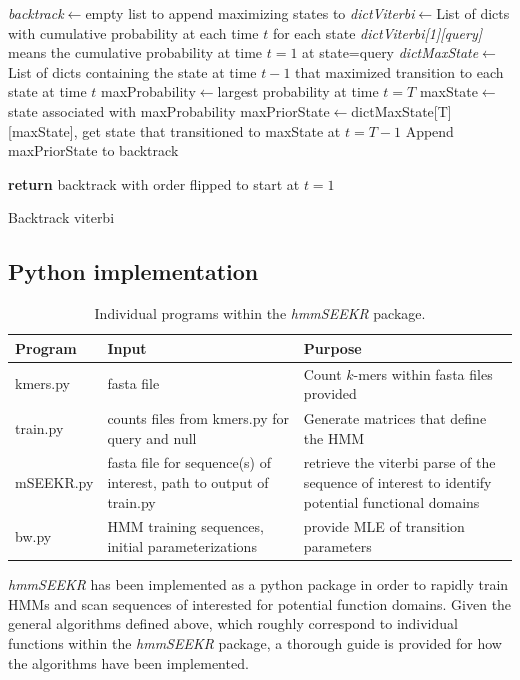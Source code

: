 \begin{algorithm}[h]
\DontPrintSemicolon
{}
\SetAlgoLined

\emph{backtrack}$\leftarrow$empty list to append maximizing states to\;
\emph{dictViterbi}$\leftarrow$List of dicts with cumulative probability at each time $t$ for each state\;
\;
\emph{dictViterbi[1][query]} means the cumulative probability at time $t=1$ at state=query\;\;
\emph{dictMaxState}$\leftarrow$List of dicts containing the state at time $t-1$ that maximized transition to each state at time $t$\;
\;
\;
maxProbability$\leftarrow$largest probability at time $t=T$\;
maxState$\leftarrow$state associated with maxProbability\;
maxPriorState$\leftarrow$dictMaxState[T][maxState], get state that transitioned to maxState at $t=T-1$\;
\;
Append maxPriorState to backtrack\;


\textbf{return} backtrack with order flipped to start at $t=1$

 \caption{Backtrack viterbi}
 \label{alg:backtrack}
\end{algorithm}

\clearpage

\subsection{Python implementation}
\begin{table}[t!]
\centering
 \begin{tabular}{|p{3cm}|p{5cm}|p{5cm}|}
 \hline
 Program & Input & Purpose\\
 \hline\hline
 kmers.py & fasta file & Count $k$-mers within fasta files provided \\ 
 \hline
 train.py & counts files from kmers.py for query and null & Generate matrices that define the HMM\\
 \hline
 mSEEKR.py & fasta file for sequence(s) of interest, path to output of train.py & retrieve the viterbi parse of the sequence of interest to identify potential functional domains \\
 \hline
bw.py & HMM training sequences, initial parameterizations & provide MLE of transition parameters \\
 \hline
 
\end{tabular}
\caption{Individual programs within the \emph{hmmSEEKR} package.}
\label{programs}
\end{table}
\emph{hmmSEEKR} has been implemented as a python package in order to rapidly train HMMs and scan sequences of interested for potential function domains. Given the general algorithms defined above, which roughly correspond to individual functions within the \emph{hmmSEEKR} package, a thorough guide is provided for how the algorithms have been implemented. 

